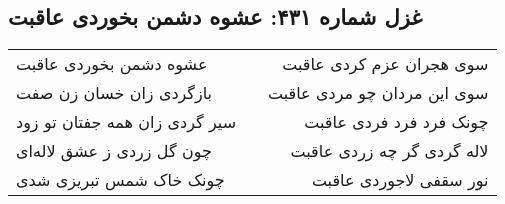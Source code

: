 \begin{center}
\section*{غزل شماره ۴۳۱: عشوه دشمن بخوردی عاقبت}
\label{sec:0431}
\begin{longtable}{l p{0.5cm} r}
عشوه دشمن بخوردی عاقبت
&&
سوی هجران عزم کردی عاقبت
\\
بازگردی زان خسان زن صفت
&&
سوی این مردان چو مردی عاقبت
\\
سیر گردی زان همه جفتان تو زود
&&
چونک فرد فرد فردی عاقبت
\\
چون گل زردی ز عشق لاله‌ای
&&
لاله گردی گر چه زردی عاقبت
\\
چونک خاک شمس تبریزی شدی
&&
نور سقفی لاجوردی عاقبت
\\
\end{longtable}
\end{center}
